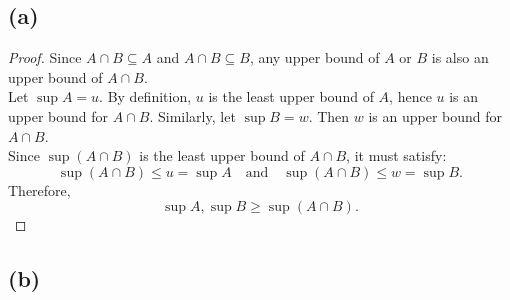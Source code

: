 \documentclass{article}
\begin{document}
\subsection*{(a)}
\begin{proof}
    Since \( A \cap B \subseteq A \) and \( A \cap B \subseteq B \), any upper bound of \( A \) or \( B \) is also an upper bound of \( A \cap B \).
    \\
    Let \( \sup A = u \). By definition, \( u \) is the least upper bound of \( A \), hence \( u \) is an upper bound for \( A \cap B \).
    Similarly, let \( \sup B = w \). Then \( w \) is an upper bound for \( A \cap B \).
    \\
    Since \( \sup(A \cap B) \) is the least upper bound of \( A \cap B \), it must satisfy:
    \[ \sup(A \cap B) \leq u = \sup A \quad \text{and} \quad \sup(A \cap B) \leq w = \sup B. \]
    Therefore,
    \[ \sup A, \sup B \geq \sup(A \cap B). \]
\end{proof}

\subsection*{(b)}
\end{document}
